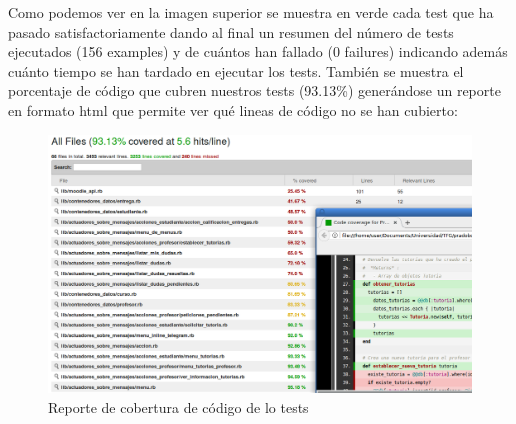 Como podemos ver en la imagen superior se muestra en verde cada test que ha pasado satisfactoriamente dando al final un resumen del número de tests ejecutados (156 examples) y de cuántos han fallado (0 failures) indicando además cuánto tiempo se han tardado en ejecutar los tests. También se muestra el porcentaje de código que cubren nuestros tests (93.13\%) generándose un reporte en formato html que permite ver qué lineas de código no se han cubierto:

\begin{figure}[H] %
\centering
\includegraphics[scale=0.3]{imagenes/random/Screenshot_2017-09-05_14-47-08.png}  %

\caption{Reporte de cobertura de código de lo tests}\label{figura94}

\end{figure}

